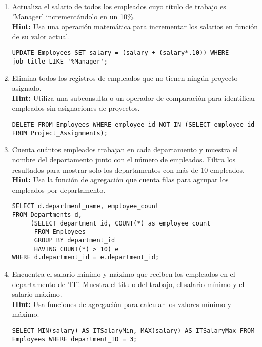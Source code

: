 \begin{enumerate}
    \item Actualiza el salario de todos los empleados cuyo título de trabajo es 'Manager' incrementándolo en un 10\%.
    \\
    \textbf{Hint:} Usa una operación matemática para incrementar los salarios en función de su valor actual.
    \begin{verbatim}
UPDATE Employees SET salary = (salary + (salary*.10)) WHERE job_title LIKE '%Manager';
    \end{verbatim}

    \item Elimina todos los registros de empleados que no tienen ningún proyecto asignado.
    \\
    \textbf{Hint:} Utiliza una subconsulta o un operador de comparación para identificar empleados sin asignaciones de proyectos.
    \begin{verbatim}
DELETE FROM Employees WHERE employee_id NOT IN (SELECT employee_id FROM Project_Assignments);
    \end{verbatim}

    \item Cuenta cuántos empleados trabajan en cada departamento y muestra el nombre del departamento junto con el número de empleados. Filtra los resultados para mostrar solo los departamentos con más de 10 empleados.
    \\
    \textbf{Hint:} Usa la función de agregación que cuenta filas para agrupar los empleados por departamento.
    \begin{verbatim}
SELECT d.department_name, employee_count
FROM Departments d,
     (SELECT department_id, COUNT(*) as employee_count
      FROM Employees
      GROUP BY department_id
      HAVING COUNT(*) > 10) e
WHERE d.department_id = e.department_id;
    \end{verbatim}

    \item Encuentra el salario mínimo y máximo que reciben los empleados en el departamento de 'IT'. Muestra el título del trabajo, el salario mínimo y el salario máximo.
    \\
    \textbf{Hint:} Usa funciones de agregación para calcular los valores mínimo y máximo.
    \begin{verbatim}
SELECT MIN(salary) AS ITSalaryMin, MAX(salary) AS ITSalaryMax FROM Employees WHERE department_ID = 3;
    \end{verbatim}


\end{enumerate}
